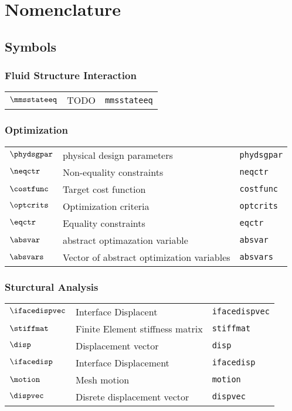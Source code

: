 \section*{Nomenclature}\label{sec:nomenclature}

\subsection*{Symbols}

\subsubsection*{Fluid Structure Interaction}
\begin{tabular}{l l l}
$\mmsstateeq$ & TODO& \texttt{mmsstateeq}\\
\end{tabular}

\subsubsection*{Optimization}
\begin{tabular}{l l l}
$\phydsgpar$ & physical design parameters& \texttt{phydsgpar}\\
$\neqctr$ & Non-equality constraints& \texttt{neqctr}\\
$\costfunc$ & Target cost function& \texttt{costfunc}\\
$\optcrits$ & Optimization criteria& \texttt{optcrits}\\
$\eqctr$ & Equality constraints& \texttt{eqctr}\\
$\absvar$ & abstract optimazation variable& \texttt{absvar}\\
$\absvars$ & Vector of abstract optimization variables& \texttt{absvars}\\
\end{tabular}

\subsubsection*{Sturctural Analysis}
\begin{tabular}{l l l}
$\ifacedispvec$ & Interface Displacent& \texttt{ifacedispvec}\\
$\stiffmat$ & Finite Element stiffness matrix& \texttt{stiffmat}\\
$\disp$ & Displacement vector& \texttt{disp}\\
$\ifacedisp$ & Interface Displacement& \texttt{ifacedisp}\\
$\motion$ & Mesh motion& \texttt{motion}\\
$\dispvec$ & Disrete displacement vector& \texttt{dispvec}\\
\end{tabular}

